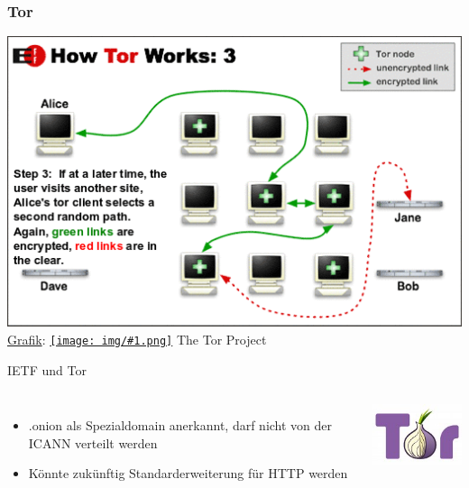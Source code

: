 \documentclass[12pt, xcolor={svgnames,table}]{beamer}
\newcommand{\cc}[1]{\texttt{[image: img/\#1.png]}\hspace{1mm}}
\begin{document}
\begin{frame}
    \frametitle{Tor}
    \includegraphics[height=0.7\textheight]{img/tor3.png}
    \\{\small \href{https://www.torproject.org/images/htw3.png}{Grafik}: \href{https://creativecommons.org/licenses/by/3.0/us/}{\cc{by}} The Tor Project}
\end{frame}

\begin{frame}{IETF und Tor}
  \begin{columns}
    \column{5.5cm}
    \footnotesize

    \begin{itemize}
      \item .onion als Spezialdomain anerkannt, darf nicht von der ICANN verteilt werden
      \item Könnte zukünftig Standarderweiterung für HTTP werden
    \end{itemize}

    \column{5cm}

    \begin{center}
      \includegraphics[width=3.5cm]{img/tor-logo.jpg}
    \par\end{center}
  \end{columns}
\end{frame}
\end{document}

